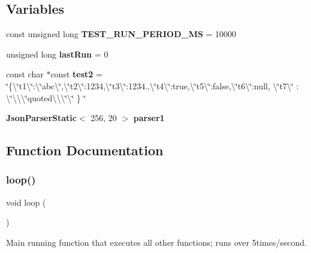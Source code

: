 \subsection*{Variables}
\begin{DoxyCompactItemize}
\item 
const unsigned long \textbf{ T\+E\+S\+T\+\_\+\+R\+U\+N\+\_\+\+P\+E\+R\+I\+O\+D\+\_\+\+MS} = 10000
\item 
unsigned long \textbf{ last\+Run} = 0
\item 
const char $\ast$const \textbf{ test2} = \char`\"{}\{\textbackslash{}\char`\"{}t1\textbackslash{}\char`\"{}\+:\textbackslash{}\char`\"{}abc\textbackslash{}\char`\"{},\textbackslash{}\char`\"{}t2\textbackslash{}\char`\"{}\+:1234,\textbackslash{}\char`\"{}t3\textbackslash{}\char`\"{}\+:1234.,\textbackslash{}\char`\"{}t4\textbackslash{}\char`\"{}\+:true,\textbackslash{}\char`\"{}t5\textbackslash{}\char`\"{}\+:false,\textbackslash{}\char`\"{}t6\textbackslash{}\char`\"{}\+:null, \textbackslash{}\char`\"{}t7\textbackslash{}\char`\"{} \+: \textbackslash{}\char`\"{}\textbackslash{}\textbackslash{}\textbackslash{}\char`\"{}quoted\textbackslash{}\textbackslash{}\textbackslash{}\char`\"{}\textbackslash{}\char`\"{} \} \char`\"{}
\item 
\textbf{ Json\+Parser\+Static}$<$ 256, 20 $>$ \textbf{ parser1}
\end{DoxyCompactItemize}


\subsection{Function Documentation}
\mbox{\label{1-parser-_json_parser_generator_r_k_8cpp_afe461d27b9c48d5921c00d521181f12f}} 
\subsubsection{loop()}
{\footnotesize\ttfamily void loop (\begin{DoxyParamCaption}{ }\end{DoxyParamCaption})}



Main running function that executes all other functions; runs over 5times/second. 



